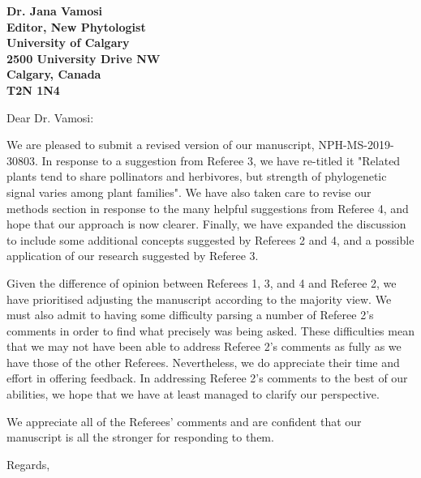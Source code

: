 \documentclass[12pt]{letter}
\begin{document}
\begin{letter}{\bf Dr. Jana Vamosi\\
               Editor, New Phytologist\\
               University of Calgary\\
               2500 University Drive NW\\
               Calgary, Canada\\
               T2N 1N4\\
                }

\opening{Dear Dr. Vamosi:}

	We are pleased to submit a revised version of our manuscript, NPH-MS-2019-30803. In response to a suggestion from Referee 3, we have re-titled it "Related plants tend to share pollinators and herbivores, but strength of phylogenetic signal varies among plant families". We have also taken care to revise our methods section in response to the many helpful suggestions from Referee 4, and hope that our approach is now clearer. Finally, we have expanded the discussion to include some additional concepts suggested by Referees 2 and 4, and a possible application of our research suggested by Referee 3. 


	Given the difference of opinion between Referees 1, 3, and 4 and Referee 2, we have prioritised adjusting the manuscript according to the majority view. We must also admit to having some difficulty parsing a number of Referee 2's comments in order to find what precisely was being asked. These difficulties mean that we may not have been able to address Referee 2's comments as fully as we have those of the other Referees. Nevertheless, we do appreciate their time and effort in offering feedback. In addressing Referee 2's comments to the best of our abilities, we hope that we have at least managed to clarify our perspective.


	We appreciate all of the Referees' comments and are confident that our manuscript is all the stronger for responding to them.


\closing{Regards,}


\end{letter}

\newpage

\setcounter{page}{1}

\end{document}
